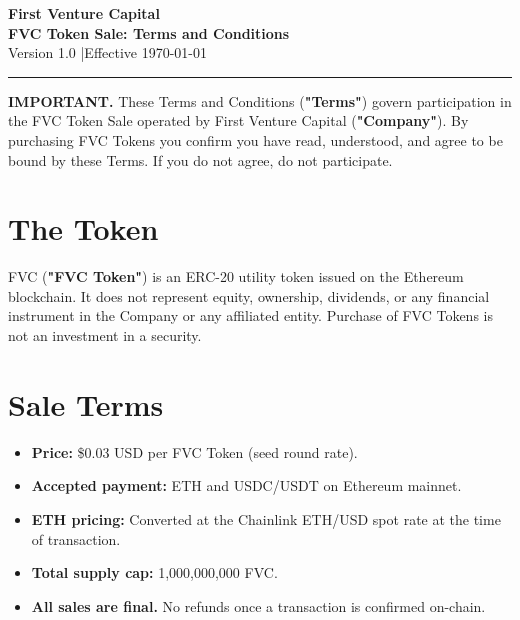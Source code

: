 \documentclass[11pt,a4paper]{article}
\begin{document}
\begin{center}
  {\LARGE\bfseries\color{fvcblue} First Venture Capital}\\[0.4em]
  {\large\bfseries FVC Token Sale: Terms and Conditions}\\[0.3em]
  {\small Version 1.0 \quad|\quad Effective \today}
\end{center}
\vspace{0.5em}
\noindent\rule{\linewidth}{1pt}
\vspace{0.5em}

\noindent\textbf{IMPORTANT.} These Terms and Conditions (\textbf{"Terms"}) govern participation in the FVC Token Sale operated by First Venture Capital (\textbf{"Company"}). By purchasing FVC Tokens you confirm you have read, understood, and agree to be bound by these Terms. If you do not agree, do not participate.

\section{The Token}

FVC (\textbf{"FVC Token"}) is an ERC-20 utility token issued on the Ethereum blockchain. It does not represent equity, ownership, dividends, or any financial instrument in the Company or any affiliated entity. Purchase of FVC Tokens is not an investment in a security.

\section{Sale Terms}

\begin{itemize}
  \item \textbf{Price:} \$0.03 USD per FVC Token (seed round rate).
  \item \textbf{Accepted payment:} ETH and USDC/USDT on Ethereum mainnet.
  \item \textbf{ETH pricing:} Converted at the Chainlink ETH/USD spot rate at the time of transaction.
  \item \textbf{Total supply cap:} 1,000,000,000 FVC.
  \item \textbf{All sales are final.} No refunds once a transaction is confirmed on-chain.
\end{itemize}
\end{document}
